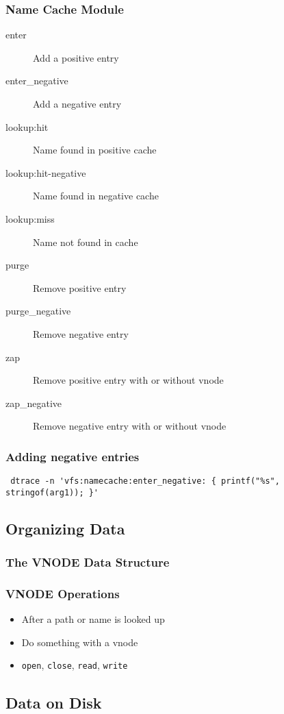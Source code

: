 \documentclass[pdftex]{beamer} %
\begin{document}
\begin{frame}[fragile]
  \frametitle{Name Cache Module}
  \begin{description}
  \item[enter] Add a positive entry
  \item[enter\_negative] Add a negative entry
  \item[lookup:hit] Name found in positive cache
  \item[lookup:hit-negative] Name found in negative cache
  \item[lookup:miss] Name not found in cache
  \item[purge] Remove positive entry
  \item[purge\_negative] Remove negative entry
  \item[zap] Remove positive entry with or without vnode
  \item[zap\_negative] Remove negative entry with or without vnode
  \end{description}
\end{frame}

\begin{frame}[fragile]
  \frametitle{Adding negative entries}
\begin{lstlisting}
 dtrace -n 'vfs:namecache:enter_negative: { printf("%s", stringof(arg1)); }'
\end{lstlisting}
\end{frame}


\subsection{Organizing Data}
\label{sec:organization}

\begin{frame}
  \frametitle{The VNODE Data Structure}
  
\end{frame}

\begin{frame}[fragile]
  \frametitle{VNODE Operations}
  \begin{itemize}
  \item After a path or name is looked up
  \item Do something with a vnode
  \item \verb|open|, \verb|close|, \verb|read|, \verb|write|
  \end{itemize}
\end{frame}

\subsection{Data on Disk}
\label{sec:disk}
\end{document}
